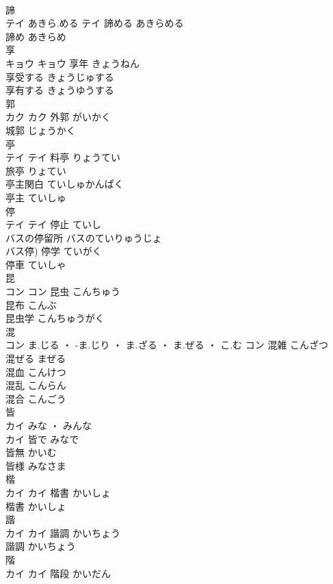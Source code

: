 \documentclass[8pt]{extreport}
\begin{document}
\begin{CJK}{UTF8}{min}
\\	諦	
\\	テイ	あきら.める	テイ	諦める	あきらめる	
\\	諦め	あきらめ	
\\	享	
\\	キョウ		キョウ	享年	きょうねん	
\\	享受する	きょうじゅする	
\\	享有する	きょうゆうする	
\\	郭	
\\	カク		カク	外郭	がいかく	
\\	城郭	じょうかく	
\\	亭	
\\	テイ		テイ	料亭	りょうてい	
\\	旅亭	りょてい	
\\	亭主関白	ていしゅかんぱく	
\\	亭主	ていしゅ	
\\	停	
\\	テイ		テイ	停止	ていし	
\\	バスの停留所	バスのていりゅうじょ	
\\	バス停)	停学	ていがく	
\\	停車	ていしゃ	
\\	昆	
\\	コン		コン	昆虫	こんちゅう	
\\	昆布	こんぶ	
\\	昆虫学	こんちゅうがく	
\\	混	
\\	コン	ま.じる ・ -ま.じり ・ ま.ざる ・ ま.ぜる ・ こ.む	コン	混雑	こんざつ	
\\	混ぜる	まぜる	
\\	混血	こんけつ	
\\	混乱	こんらん	
\\	混合	こんごう	
\\	皆	
\\	カイ	みな ・ みんな
\\	カイ	皆で	みなで	
\\	皆無	かいむ	
\\	皆様	みなさま	
\\	楷	
\\	カイ		カイ	楷書	かいしょ	
\\	楷書	かいしょ	
\\	諧	
\\	カイ		カイ	諧調	かいちょう	
\\	諧調	かいちょう	
\\	階	
\\	カイ		カイ	階段	かいだん	

\end{CJK}
\end{document}
